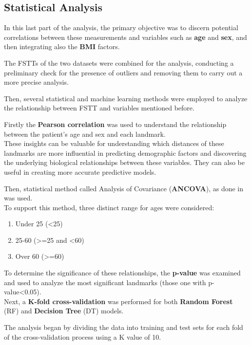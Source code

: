 \documentclass[journal,article,submit,pdftex,moreauthors]{Definitions/mdpi}
\begin{document}
\subsection{Statistical Analysis} \label{sec:sez2-5}

In this last part of the analysis, the primary objective was to discern potential correlations between these measurements and variables such as \textbf{age} and \textbf{sex}, and then integrating also the \textbf{BMI} factors. 

The FSTTs of the two datasets were combined for the analysis, conducting a preliminary check for the presence of outliers and removing them to carry out a more precise analysis.

Then, several statistical and machine learning methods were employed to analyze the relationship between FSTT and variables mentioned before.

Firstly the \textbf{Pearson correlation} was used to understand the relationship between the patient’s age and sex and each landmark. 
\\These insights can be valuable for understanding which distances of these landmarks are more influential in predicting demographic factors and discovering the underlying biological relationships between these variables. They can also be useful in creating more accurate predictive models.

Then, statistical method called Analysis of Covariance (\textbf{ANCOVA}), as done in \cite{ref19} was used.\\
To support this method, three distinct range for ages were considered:
\begin{enumerate}
    \item Under 25 (<25)
    \item 25-60 (>=25 and <60)
    \item Over 60 (>=60)
\end{enumerate}

To determine the significance of these relationships, the \textbf{p-value} was examined and used to analyze the most significant landmarks (those one with p-value<0.05).\\ 

Next, a \textbf{K-fold cross-validation} was performed for both \textbf{Random Forest} (RF) and \textbf{Decision Tree} (DT) models.

The analysis began by dividing the data into training and test sets for each fold of the cross-validation process using a K value of 10. 
\end{document}
